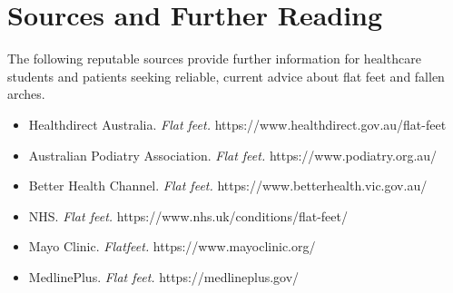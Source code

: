 \section*{Sources and Further Reading}
The following reputable sources provide further information for healthcare students and patients seeking reliable, current advice about flat feet and fallen arches.
\begin{itemize}
    \item Healthdirect Australia. \textit{Flat feet.} https://www.healthdirect.gov.au/flat-feet
    \item Australian Podiatry Association. \textit{Flat feet.} https://www.podiatry.org.au/
    \item Better Health Channel. \textit{Flat feet.} https://www.betterhealth.vic.gov.au/
    \item NHS. \textit{Flat feet.} https://www.nhs.uk/conditions/flat-feet/
    \item Mayo Clinic. \textit{Flatfeet.} https://www.mayoclinic.org/
    \item MedlinePlus. \textit{Flat feet.} https://medlineplus.gov/
\end{itemize}
